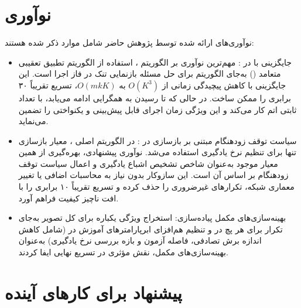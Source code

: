 \section{نوآوری}
نو‌آوری‌های ارائه شده توسط پژوهش حاضر شامل موارد ذکر شده هستند:
\begin{itemize}
    \item جایگزینی  با  در : مهم‌ترین نوآوری بر الگوریتم ، استفاده از الگوریتم تطبیق تعقیبی متعامد () به‌جای الگوریتم  برای حل مسئله بازنمایی تنک در فاز اجرا است. این جایگزینی با کاهش پیچیدگی زمانی از $O(K^3)$ به $O(mkK)$، تسریع تقریباً ۳۰ برابری را ممکن ساخت. در حالی که  تا رسیدن به همگرایی ادامه می‌یابد،  با تعداد ثابتی اتم کار می‌کند و این ویژگی زمان اجرای قابل پیش‌بینی و یکنواختی را تضمین می‌نماید.

    \item سیاست توقف زودهنگام مبتنی بر  بازسازی در : در الگوریتم اصلی ، معیار  بازسازی تنها برای تنظیم نرخ یادگیری استفاده می‌شد. نوآوری پیشنهادی، بهره‌گیری از همین معیار موجود به‌عنوان شاخص تشخیص اشباع یادگیری و اعمال سیاست توقف زودهنگام بر اساس آن است. این سازوکار بدون نیاز به محاسبات اضافی یا تغییر معماری شبکه، تکرارهای غیرضروری را حذف کرده و تسریع تقریباً ۱۰ برابری را با افت ناچیز کیفیت فراهم آورد.

    \item بهینه‌سازی‌های مکمل پیاده‌سازی: استخراج ویژگی یکباره برای کل تصویر به‌جای تکرار برای هر پچ در  و تنظیم هم‌افزای ابرپارامترهای آموزش در  (شامل کاهش اندازه برش تصادفی، فاصله آزمون و بازه بررسی نرخ یادگیری) به‌عنوان بهینه‌سازی‌های مکمل، نقش مؤثری در تسریع نهایی ایفا کردند.
\end{itemize}

\section{پیشنهاد برای کارهای آینده}

